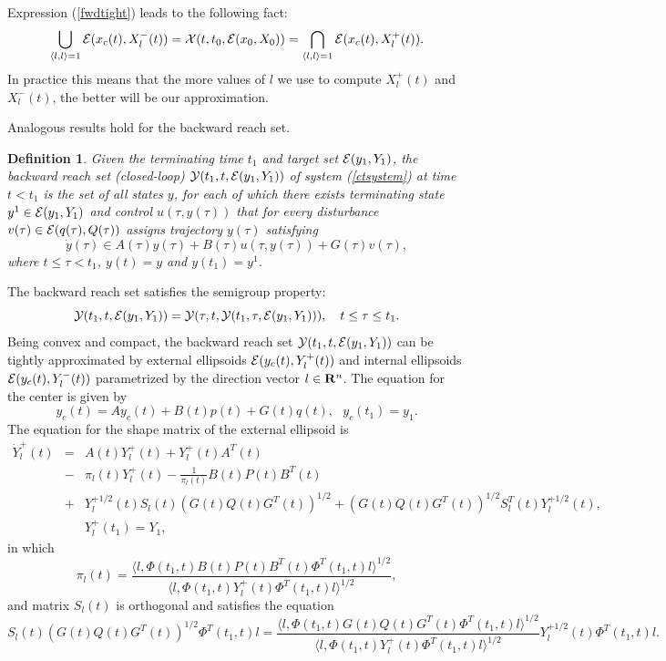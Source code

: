 \documentclass{report}
\newtheorem{df}{Definition}[section]
\newcommand{\bd}{\begin{df}}
\newcommand{\ed}{\end{df}}
\newcommand{\EE}{{\cal E}}
\newcommand{\XX}{{\cal X}}
\newcommand{\YY}{{\cal Y}}
\begin{document}
Expression (\ref{fwdtight}) leads to the following fact:
\begin{equation}
\bigcup_{\langle l,l\rangle=1}\EE(x_c(t),X^-_l(t)) = \XX(t,t_0,\EE(x_0,X_0)) =
\bigcap_{\langle l,l\rangle=1}\EE(x_c(t),X^+_l(t)).
\end{equation}
In practice this means that the more values of $l$ we use to compute $X^+_l(t)$ and
$X^-_l(t)$, the better will be our approximation.

Analogous results hold for the backward reach set.
\bd
Given the terminating time $t_1$ and target set $\EE(y_1,Y_1)$,
the backward reach set (closed-loop) $\YY(t_1,t,\EE(y_1,Y_1))$
of system (\ref{ctsystem}) at time $t<t_1$ is the set of all states $y$,
for each of which there exists terminating state $y^1\in\EE(y_1,Y_1)$
and control $u(\tau,y(\tau))$ that for every disturbance
$v(\tau)\in\EE(q(\tau),Q(\tau))$ assigns trajectory $y(\tau)$ satisfying
\[ \dot{y}(\tau)\in A(\tau)y(\tau)+B(\tau)u(\tau,y(\tau)) + G(\tau)v(\tau), \]
where $t\leq\tau<t_1$, $y(t)=y$ and $y(t_1)=y^1$.
\ed
The backward reach set satisfies the semigroup property:
\[ \YY(t_1,t,\EE(y_1,Y_1)) = \YY(\tau,t,\YY(t_1,\tau,\EE(y_1,Y_1))),
~~~ t\leq\tau\leq t_1. \]
Being convex and compact, the backward reach set $\YY(t_1,t,\EE(y_1,Y_1))$
can be tightly approximated by external ellipsoids $\EE(y_c(t),Y^+_l(t))$
and internal ellipsoids $\EE(y_c(t),Y^-_l(t))$ parametrized by the
direction vector $l\in{\bf R}^n$. The equation for the center is given by
\begin{equation}
y_c(t) = Ay_c(t) + B(t)p(t) + G(t)q(t), ~~~ y_c(t_1) = y_1.\label{bckcenter}
\end{equation}
The equation for the shape matrix of the external ellipsoid is
\begin{eqnarray}
\dot{Y}^+_l(t) & = & A(t)Y^+_l(t) + Y^+_l(t)A^T(t) \label{bckext1} \\
& - & \pi_l(t)Y^+_l(t) - \frac{1}{\pi_l(t)}B(t)P(t)B^T(t) \label{bckext2} \\
& + & Y_l^{+1/2}(t)S_l(t)(G(t)Q(t)G^T(t))^{1/2} +
(G(t)Q(t)G^T(t))^{1/2}S_l^T(t)Y_l^{+1/2}(t), \label{bckext3} \\
& & Y^+_l(t_1) = Y_1, \label{bckext4}
\end{eqnarray}
in which
\[ \pi_l(t) = \frac{\langle l,
\Phi(t_1,t)B(t)P(t)B^T(t)\Phi^T(t_1,t)l\rangle^{1/2}}{\langle l,
\Phi(t_1,t)Y^+_l(t)\Phi^T(t_1,t)l\rangle^{1/2}}, \]
and matrix $S_l(t)$ is orthogonal and satisfies the equation
\[ S_l(t)(G(t)Q(t)G^T(t))^{1/2}\Phi^T(t_1,t)l = \frac{\langle l,
\Phi(t_1,t)G(t)Q(t)G^T(t)\Phi^T(t_1,t)l\rangle^{1/2}}{\langle l,
\Phi(t_1,t)Y_l^+(t)\Phi^T(t_1,t)l\rangle^{1/2}}Y_l^{+1/2}(t)\Phi^T(t_1,t)l. \]
\end{document}
